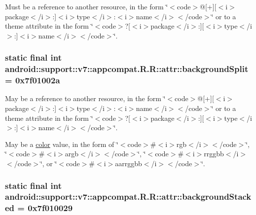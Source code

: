 Must be a reference to another resource, in the form \char`\"{}$<$code$>$@\mbox{[}+\mbox{]}\mbox{[}$<$i$>$package$<$/i$>$:\mbox{]}$<$i$>$type$<$/i$>$:$<$i$>$name$<$/i$>$$<$/code$>$\char`\"{} or to a theme attribute in the form \char`\"{}$<$code$>$?\mbox{[}$<$i$>$package$<$/i$>$:\mbox{]}\mbox{[}$<$i$>$type$<$/i$>$:\mbox{]}$<$i$>$name$<$/i$>$$<$/code$>$\char`\"{}. \hypertarget{classandroid_1_1support_1_1v7_1_1appcompat_1_1_r_1_1attr_510129b5ac49cadbe350ba1b1efc6f89}{
\subsubsection[{backgroundSplit}]{\setlength{\rightskip}{0pt plus 5cm}static final int android::support::v7::appcompat.R.R::attr::backgroundSplit = 0x7f01002a}}
\label{classandroid_1_1support_1_1v7_1_1appcompat_1_1_r_1_1attr_510129b5ac49cadbe350ba1b1efc6f89}


May be a reference to another resource, in the form \char`\"{}$<$code$>$@\mbox{[}+\mbox{]}\mbox{[}$<$i$>$package$<$/i$>$:\mbox{]}$<$i$>$type$<$/i$>$:$<$i$>$name$<$/i$>$$<$/code$>$\char`\"{} or to a theme attribute in the form \char`\"{}$<$code$>$?\mbox{[}$<$i$>$package$<$/i$>$:\mbox{]}\mbox{[}$<$i$>$type$<$/i$>$:\mbox{]}$<$i$>$name$<$/i$>$$<$/code$>$\char`\"{}. 

May be a \hyperlink{classandroid_1_1support_1_1v7_1_1appcompat_1_1_r_1_1color}{color} value, in the form of \char`\"{}$<$code$>$\#$<$i$>$rgb$<$/i$>$$<$/code$>$\char`\"{}, \char`\"{}$<$code$>$\#$<$i$>$argb$<$/i$>$$<$/code$>$\char`\"{}, \char`\"{}$<$code$>$\#$<$i$>$rrggbb$<$/i$>$$<$/code$>$\char`\"{}, or \char`\"{}$<$code$>$\#$<$i$>$aarrggbb$<$/i$>$$<$/code$>$\char`\"{}. \hypertarget{classandroid_1_1support_1_1v7_1_1appcompat_1_1_r_1_1attr_98c2af8df9b4a7f120565f0547113bfa}{
\subsubsection[{backgroundStacked}]{\setlength{\rightskip}{0pt plus 5cm}static final int android::support::v7::appcompat.R.R::attr::backgroundStacked = 0x7f010029}}
\label{classandroid_1_1support_1_1v7_1_1appcompat_1_1_r_1_1attr_98c2af8df9b4a7f120565f0547113bfa}


